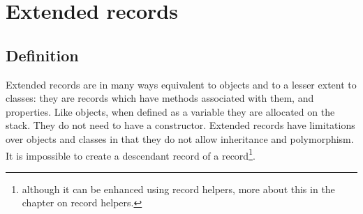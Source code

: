 %
%
%
%
%
%
%
%
%

\chapter{Extended records}
\label{ch:ExtendedRecords}

\section{Definition}
Extended records are in many ways equivalent to objects and to a lesser
extent to classes: they are records which have methods associated with 
them, and properties. Like objects, when defined as a variable they are 
allocated on the stack. They do not need to have a constructor.
Extended records have limitations over objects and classes in that they 
do not allow inheritance and polymorphism. It is impossible to create a
descendant record of a record\footnote{although it can be enhanced using record
helpers, more about this in the chapter on record helpers.}.

